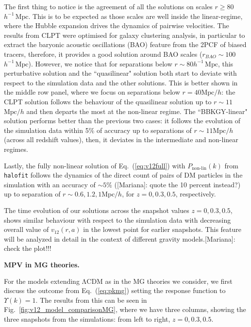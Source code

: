 \documentclass[%
 reprint,
groupedaddress,
nofootinbib,
nobibnotes,
 amsmath,amssymb,
 aps,
]{revtex4-2}
\newcommand{\code}[1]{{\texttt{#1}}}
\newcommand{\refeq}[1]{Eq.~(\ref{eq:#1})}
\newcommand{\reffig}[1]{Fig.~\ref{fig:#1}}
\newcommand{\pairvel}{$v_{12}(r,a)$}
\newcommand{\lcdm}{$\mathrm{\Lambda CDM}$}
\newcommand{\Mpch}{$h^{-1}\,\mbox{Mpc}$}
\newcommand{\MpchInv}{$\mbox{Mpc}/h$}
\newcommand{\<}{\langle}
\renewcommand{\>}{\rangle}
\newcommand{\MJ}[1]{\textcolor{WildStrawberry}{[Mariana]: #1}}
\begin{document}
The first thing to notice is the agreement of all the solutions on scales $r\geq 80$\Mpch. This is to be expected as those scales are well inside the linear-regime, where the Hubble expansion drives the dynamics of pairwise velocities. 
%
The results from CLPT were optimised for galaxy  clustering analysis, in particular to extract the baryonic acoustic oscillations (BAO) feature from the 2PCF of biased tracers, therefore, it provides a good solution around BAO scales ($r_{BAO} \sim 100$ \Mpch).
%
However, we notice that for separations below  $r \sim 80$\Mpch, this perturbative solution and the ``quasilinear" solution  %
both  start to deviate with respect to the simulation data and the other solutions. 
This is better shown in the middle row panel, where we focus on separations below  $r= 40$\MpchInv{}: the CLPT solution follows the behaviour of the quasilinear solution up to $r\sim11$\MpchInv{} and then departs the most at the non-linear regime. The ``BBKGY-linear" solution  performs better than the previous two cases: it follows the evolution of the simulation data within 5$\%$ of accuracy up to separations of $r\sim11$\MpchInv{} (across all redshift values), then, it deviates in the intermediate and non-linear regimes. 

Lastly, the fully non-linear solution of \refeq{v12full} with $P_{\text{non-lin}}(k)$ from \code{halofit} follows the dynamics of the direct count of pairs of DM particles in the simulation with an accuracy of $\sim 5\%$ (\MJ{quote the 10 percent instead?}) up to separation of $r\sim0.6, 1.2, 1$\MpchInv{}, for $z=0, 0.3, 0.5$, respectively. 

The time evolution of our solutions across the snapshot values $z=0, 0.3, 0.5$, shows similar behaviour with respect to the simulation data with decreasing overall value of \pairvel{} in the lowest point for earlier snapshots. This feature will be analyzed in detail in the context of different gravity models.\MJ{check the plot!!! }

\textbf{MPV in MG theories.}

For the models extending \lcdm{} as in the MG theories we consider, we first discuss the outcome from \refeq{pkmg} setting the response function to  $\Upsilon(k) =1$. %
The results from this can be seen in \reffig{v12_model_comparisonMG}, where we have three columns, showing the three snapshots from the simulations: from left to right, $z=0, 0.3, 0.5$. 
\end{document}
